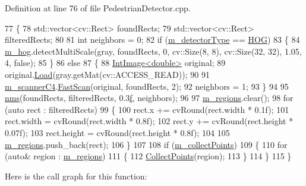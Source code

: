 Definition at line 76 of file Pedestrian\+Detector.\+cpp.


\begin{DoxyCode}
77 \{
78     std::vector<cv::Rect> foundRects;
79     std::vector<cv::Rect> filteredRects;
80 
81     \textcolor{keywordtype}{int} neighbors = 0;
82     \textcolor{keywordflow}{if} (\mbox{\hyperlink{class_pedestrian_detector_a4e0492d82780eb31f763972173d56d9d}{m\_detectorType}} == \mbox{\hyperlink{class_pedestrian_detector_aa2136624089c144b4ef5f3598de00d8ca47cb01f997c4439468112272761fc7de}{HOG}})
83     \{
84         \mbox{\hyperlink{class_pedestrian_detector_ad00796408688b6465fb988796536680d}{m\_hog}}.detectMultiScale(gray, foundRects, 0, cv::Size(8, 8), cv::Size(32, 32), 1.05, 4, \textcolor{keyword}{false});
85     \}
86     \textcolor{keywordflow}{else}
87     \{
88         \mbox{\hyperlink{class_int_image}{IntImage<double>}} original;
89         original.\mbox{\hyperlink{class_int_image_a9e74890b8f45d03e0c4aa335a96849d1}{Load}}(gray.getMat(cv::ACCESS\_READ));
90 
91         \mbox{\hyperlink{class_pedestrian_detector_a68a45a369623a3492065bdf29e81b29c}{m\_scannerC4}}.\mbox{\hyperlink{class_detection_scanner_aa27d494b253975922d853070aab7ce4d}{FastScan}}(original, foundRects, 2);
92         neighbors = 1;
93     \}
94 
95     \mbox{\hyperlink{nms_8h_a172e28c9d820b35a79650a1337c6f80c}{nms}}(foundRects, filteredRects, 0.3\mbox{\hyperlink{rings_8cpp_a77369fc4d5326a16d2c603e032023528}{f}}, neighbors);
96 
97     \mbox{\hyperlink{class_base_detector_a409c20093acba261db8354ca72058fce}{m\_regions}}.clear();
98     \textcolor{keywordflow}{for} (\textcolor{keyword}{auto} rect : filteredRects)
99     \{
100         rect.x += cvRound(rect.width * 0.1f);
101         rect.width = cvRound(rect.width * 0.8f);
102         rect.y += cvRound(rect.height * 0.07f);
103         rect.height = cvRound(rect.height * 0.8f);
104 
105         \mbox{\hyperlink{class_base_detector_a409c20093acba261db8354ca72058fce}{m\_regions}}.push\_back(rect);
106     \}
107 
108     \textcolor{keywordflow}{if} (\mbox{\hyperlink{class_base_detector_a403cbf784fcb960bdb7d080c86c4a2ea}{m\_collectPoints}})
109     \{
110         \textcolor{keywordflow}{for} (\textcolor{keyword}{auto}& region : \mbox{\hyperlink{class_base_detector_a409c20093acba261db8354ca72058fce}{m\_regions}})
111         \{
112             \mbox{\hyperlink{class_base_detector_a20380b0980c6f262b0829f37fb89d2a7}{CollectPoints}}(region);
113         \}
114     \}
115 \}
\end{DoxyCode}
Here is the call graph for this function\+:\nopagebreak

